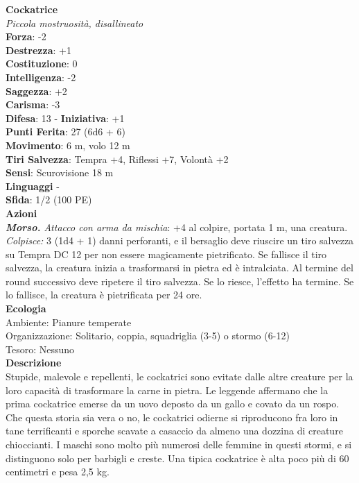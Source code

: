 \begin{multicols}{2}
\medskip\textbf{Cockatrice}\\
\emph{Piccola mostruosità, disallineato}\\
\textbf{Forza}: -2\\
\textbf{Destrezza}: +1\\
\textbf{Costituzione}: 0\\
\textbf{Intelligenza}: -2\\
\textbf{Saggezza}: +2\\
\textbf{Carisma}: -3\\
\textbf{Difesa}: 13 - \textbf{Iniziativa}: +1\\
\textbf{Punti Ferita}: 27 (6d6 + 6)\\
\textbf{Movimento}: 6 m, volo 12 m\\
\textbf{Tiri Salvezza}: Tempra +4, Riflessi +7, Volontà +2\\
\textbf{Sensi}: Scurovisione 18 m\\
\textbf{Linguaggi} -\\
\textbf{Sfida}: 1/2 (100 PE)\smallskip\\
\smallskip\textbf{Azioni}\\
\emph{\textbf{Morso.} Attacco con arma da mischia}: +4 al colpire, portata 1 m, una creatura.\\
\emph{Colpisce:} 3 (1d4 + 1) danni perforanti, e il bersaglio deve riuscire un tiro salvezza su Tempra DC  12 per non essere magicamente pietrificato. Se fallisce il tiro salvezza, la creatura inizia a trasformarsi in pietra ed è intralciata. Al termine del round successivo deve ripetere il tiro salvezza. Se lo riesce, l'effetto ha termine. Se lo fallisce, la creatura è pietrificata per 24 ore.\\
\textbf{Ecologia}\\
Ambiente: Pianure temperate\\
Organizzazione: Solitario, coppia, squadriglia (3-5) o stormo (6-12)\\
Tesoro: Nessuno\\
\textbf{Descrizione}\\
Stupide, malevole e repellenti, le cockatrici sono evitate dalle altre creature per la loro capacità di trasformare la carne in pietra. Le leggende affermano che la prima cockatrice emerse da un uovo deposto da un gallo e covato da un rospo. Che questa storia sia vera o no, le cockatrici odierne si riproducono fra loro in tane terrificanti e sporche scavate a casaccio da almeno una dozzina di creature chioccianti. I maschi sono molto più numerosi delle femmine in questi stormi, e si distinguono solo per barbigli e creste. Una tipica cockatrice è alta poco più di 60 centimetri e pesa 2,5 kg.\\

\end{multicols}
